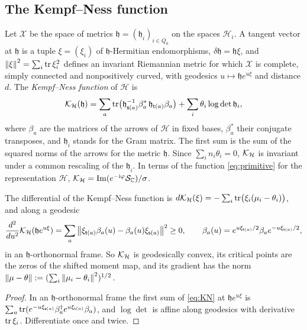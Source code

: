 \subsection{The Kempf--Ness function}
Let $\mathcal X$ be the space of metrics
$\mathfrak h=(\mathfrak h_i)_{i\in Q_0}$ on the spaces $\mathcal H_i$. A
tangent vector at $\mathfrak h$ is a tuple $\xi=(\xi_i)$ of
$\mathfrak h$-Hermitian endomorphisms, $\delta\mathfrak h=\mathfrak h\xi$, and
$\left\lVert\xi\right\rVert^2=\sum_i\operatorname{tr}\xi_i^2$ defines an invariant Riemannian metric for which
$\mathcal X$ is complete, simply connected and nonpositively curved, with
geodesics $u\mapsto\mathfrak he^{u\xi}$ and distance $d$. The
\emph{Kempf--Ness function} of $\mathcal H$ is
\begin{equation}\label{eq:KN}
 \mathcal K_{\mathcal H}(\mathfrak h)=\sum_a\operatorname{tr}\bigl(\mathfrak h_{\mathsf s(a)}^{-1}\beta_a^*\,\mathfrak h_{\mathsf t(a)}\beta_a\bigr)
 +\sum_i\theta_i\log\det\mathfrak h_i ,
\end{equation}
where $\beta_a$ are the matrices of the arrows of $\mathcal H$ in fixed bases,
$\beta_a^*$ their conjugate transposes, and $\mathfrak h_i$ stands for the
Gram matrix. The first sum is the sum of the squared norms of the arrows for
the metric $\mathfrak h$. Since $\sum_in_i\theta_i=0$, $\mathcal K_{\mathcal H}$ is
invariant under a common rescaling of the $\mathfrak h_i$. In terms of the
function \eqref{eq:primitive} for the representation $\mathcal H$,
$\mathcal K_{\mathcal H}=\operatorname{Im}(e^{-\mathrm i\varphi}\mathcal S_{\mathbb C})/\sigma$.

\begin{lemma}\label{lem:variation}
The differential of the Kempf--Ness function is
$d\mathcal K_{\mathcal H}(\xi)=-\sum_i\operatorname{tr}\bigl(\xi_i(\mu_i-\theta_i)\bigr)$, and along
a geodesic
\[
 \frac{d^2}{du^2}\mathcal K_{\mathcal H}(\mathfrak he^{u\xi})
 =\sum_a\left\lVert\xi_{\mathsf t(a)}\beta_a(u)-\beta_a(u)\xi_{\mathsf s(a)}\right\rVert^2\geq0,\qquad
 \beta_a(u)=e^{u\xi_{\mathsf t(a)}/2}\beta_ae^{-u\xi_{\mathsf s(a)}/2},
\]
in an $\mathfrak h$-orthonormal frame. So $\mathcal K_{\mathcal H}$ is geodesically
convex, its critical points are the zeros of the shifted moment map, and its
gradient has the norm $\left\lVert\mu-\theta\right\rVert:=(\sum_i\left\lVert\mu_i-\theta_i\right\rVert^2)^{1/2}$.
\end{lemma}

\begin{proof}
In an $\mathfrak h$-orthonormal frame the first sum of \eqref{eq:KN} at
$\mathfrak he^{u\xi}$ is
$\sum_a\operatorname{tr}(e^{-u\xi_{\mathsf s(a)}}\beta_a^\dagger e^{u\xi_{\mathsf t(a)}}\beta_a)$,
and $\log\det$ is affine along geodesics with derivative $\operatorname{tr}\xi_i$.
Differentiate once and twice.
\end{proof}

